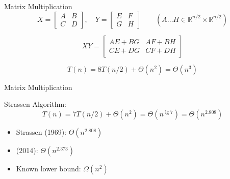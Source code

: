 \documentclass{beamer}
\begin{document}
\begin{frame}{Matrix Multiplication}
  \begin{displaymath}
	X = \begin{bmatrix} A & B \\ C & D \end{bmatrix}, \quad
	Y = \begin{bmatrix} E & F \\ G & H \end{bmatrix} \qquad (A \ldots H \in
	\mathbb{R}^{n/2} \times \mathbb{R}^{n/2})
  \end{displaymath}

  \[
    XY = \begin{bmatrix} AE + BG & AF + BH \\ CE + DG & CF + DH \end{bmatrix}
  \]

  \[
    T(n) = 8T(n/2) + \Theta(n^2) = \Theta(n^3)
  \]
\end{frame}
\begin{frame}{Matrix Multiplication}
  \begin{block}{Strassen Algorithm:}
    \[
      T(n) = 7T(n/2) + \Theta(n^2) = \Theta(n^{\lg {7}}) =
     \Theta(n^{2.808})
    \]
  \end{block}

  \begin{itemize}
    \item Strassen (1969): $\Theta(n^{2.808})$
    \item (2014): $\Theta(n^{2.373})$
    \item Known lower bound: $\Omega(n^{2})$
  \end{itemize}
\end{frame}
\end{document}
